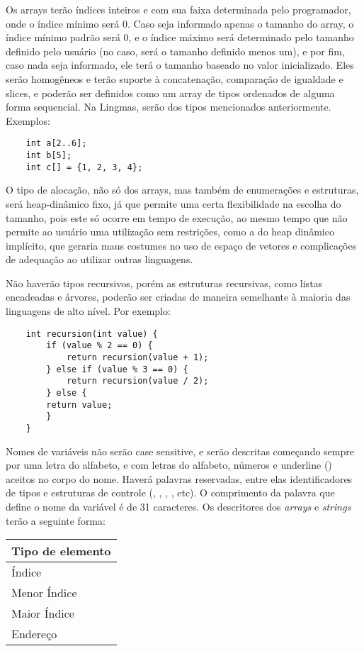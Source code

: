 Os arrays terão índices inteiros e com sua faixa determinada pelo programador,
onde o índice mínimo será 0. Caso seja informado apenas o tamanho do array, o
índice mínimo padrão será 0, e o índice máximo será determinado pelo tamanho
definido pelo usuário (no caso, será o tamanho definido menos um), e por fim,
caso nada seja informado, ele terá o tamanho baseado no valor inicializado.
Eles serão homogêneos e terão suporte à concatenação, comparação de igualdade e
slices, e poderão ser definidos como um array de tipos ordenados de alguma
forma sequencial. Na Lingmas, serão dos tipos mencionados anteriormente.
Exemplos:

\begin{lstlisting}
    int a[2..6];
    int b[5];
    int c[] = {1, 2, 3, 4};
\end{lstlisting}


O tipo de alocação, não só dos arrays, mas também de enumerações e estruturas,
será heap-dinâmico fixo, já que permite uma certa flexibilidade na escolha do
tamanho, pois este só ocorre em tempo de execução, ao mesmo tempo que não
permite ao usuário uma utilização sem restrições, como a do heap dinâmico
implícito, que geraria maus costumes no uso de espaço de vetores e complicações
de adequação ao utilizar outras linguagens.

Não haverão tipos recursivos, porém as estruturas recursivas, como listas
encadeadas e árvores, poderão ser criadas de maneira semelhante à maioria das
linguagens de alto nível. Por exemplo:

\begin{lstlisting}
    int recursion(int value) {
        if (value % 2 == 0) {
            return recursion(value + 1);
        } else if (value % 3 == 0) {
            return recursion(value / 2);
        } else {
        return value;
        }
    }
\end{lstlisting}

Nomes de variáveis não serão case sensitive, e serão descritas começando sempre
por uma letra do alfabeto, e com letras do alfabeto, números e underline
(\ic{_}) aceitos no corpo do nome. Haverá palavras reservadas, entre elas
identificadores de tipos e estruturas de controle (, ,
, , etc). O comprimento da palavra que define o nome da
variável é de 31 caracteres. Os descritores dos \emph{arrays} e \emph{strings}
terão a seguinte forma:

\begin{tabular}{| l |}
    \hline
    Tipo de elemento \\
    \hline
    Índice \\
    \hline
    Menor Índice \\
    \hline
    Maior Índice \\
    \hline
    Endereço \\
    \hline
\end{tabular}

